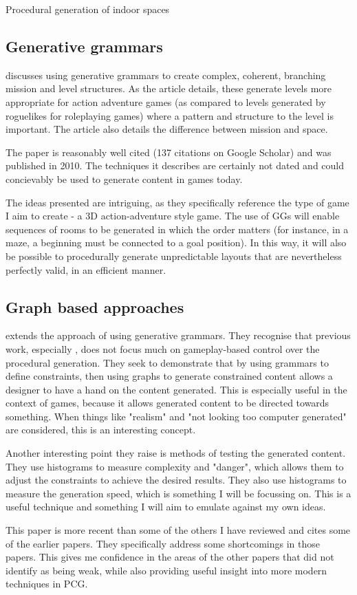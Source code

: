 \documentclass[review]{cmpreport}
\begin{document}
\begin{section}{Procedural generation of indoor spaces}
\subsection{Generative grammars}
\cite{Dormans:2010:ALD:1814256.1814257} discusses using generative grammars to create complex, coherent, branching mission and level structures. As the article details, these generate levels more appropriate for action adventure games (as compared to levels generated by roguelikes for roleplaying games) where a pattern and structure to the level is important. The article also details the difference between mission and space. \par
The paper is reasonably well cited (137 citations on Google Scholar) and was published in 2010. The techniques it describes are certainly not dated and could concievably be used to generate content in games today. \par  
The ideas presented are intriguing, as they specifically reference the type of game I aim to create - a 3D action-adventure style game. The use of GGs will enable sequences of rooms to be generated in which the order matters (for instance, in a maze, a beginning must be connected to a goal position). In this way, it will also be possible to procedurally generate unpredictable layouts that are nevertheless perfectly valid, in an efficient manner.

\subsection{Graph based approaches}
\cite{van2013designing} extends the approach of using generative grammars. They recognise that previous work, especially \cite{sbpcg}, does not focus much on gameplay-based control over the procedural generation. They seek to demonstrate that by using grammars to define constraints, then using graphs to generate constrained content allows a designer to have a hand on the content generated. This is especially useful in the context of games, because it allows generated content to be directed towards something. When things like "realism" and "not looking too computer generated" are considered, this is an interesting concept. \par
Another interesting point they raise is methods of testing the generated content. They use histograms to measure complexity and "danger", which allows them to adjust the constraints to achieve the desired results. They also use histograms to measure the generation speed, which is something I will be focussing on. This is a useful technique and something I will aim to emulate against my own ideas. \par
This paper is more recent than some of the others I have reviewed and cites some of the earlier papers. They specifically address some shortcomings in those papers. This gives me confidence in the areas of the other papers that did not identify as being weak, while also providing useful insight into more modern techniques in PCG. 

\end{section}
\end{document}
